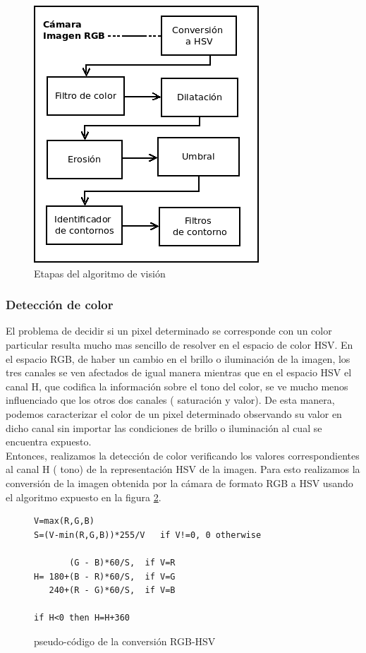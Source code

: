 \begin{figure}[tpb]
\begin{center}
  \includegraphics[scale=0.6]{figuras/vision-flow.png}
\end{center}
  \caption{Etapas del algoritmo de visión }
  \label{fig:alg_steps}
\end{figure}


\subsubsection{Detecci\'on de color}
El problema de decidir si un pixel determinado se corresponde con un color particular resulta mucho mas sencillo de resolver en el espacio de color HSV. En el espacio RGB, de haber un cambio en el brillo o iluminación de la imagen, los tres canales se ven afectados de igual manera mientras que en el espacio HSV el canal H, que codifica la información sobre el tono del color, se ve mucho menos influenciado que los otros dos canales ( saturación y valor). De esta manera, podemos caracterizar el color de un pixel determinado observando su valor en dicho canal sin importar las condiciones de brillo o iluminación al cual se encuentra expuesto.
\\ \indent Entonces, realizamos la detección de color verificando los valores correspondientes al canal H ( tono) de la representación HSV de la imagen. Para esto realizamos la conversión de la imagen obtenida por la cámara  de formato RGB a HSV usando el algoritmo expuesto en la figura \ref{code:hsv}.
\begin{figure}[tpb]
\begin{verbatim}
V=max(R,G,B)
S=(V-min(R,G,B))*255/V   if V!=0, 0 otherwise

       (G - B)*60/S,  if V=R
H= 180+(B - R)*60/S,  if V=G
   240+(R - G)*60/S,  if V=B

if H<0 then H=H+360
\end{verbatim}
\label{code:hsv}
\caption{pseudo-código de la conversión RGB-HSV}
\end{figure}


